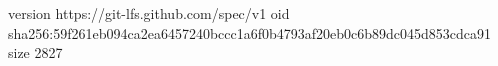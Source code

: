 version https://git-lfs.github.com/spec/v1
oid sha256:59f261eb094ca2ea6457240bccc1a6f0b4793af20eb0c6b89dc045d853cdca91
size 2827
